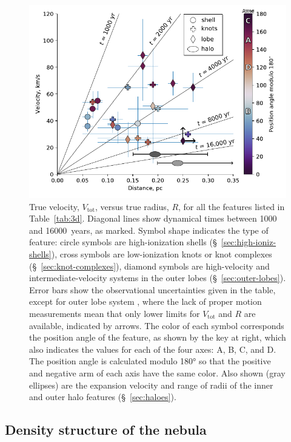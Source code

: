 \documentclass[useAMS, usenatbib]{mnras}
\begin{document}
\begin{figure}
  \includegraphics[width=\linewidth]
  {figs/vel-radius-systems-annotated.pdf}
  \caption{
    True velocity, \(V_{\text{tot}}\), versus true radius, \(R\), for all the features listed in Table~\ref{tab:3d}.
    Diagonal lines show dynamical times between \num{1000} and \SI{16000}{years}, as marked.
    Symbol shape indicates the type of feature:
    circle symbols are high-ionization shells (\S~\ref{sec:high-ioniz-shells}),
    cross symbols are low-ionization knots or knot complexes (\S~\ref{sec:knot-complexes}),
    diamond symbols are high-velocity and intermediate-velocity systems in the outer lobes (\S~\ref{sec:outer-lobes}).
    Error bars show the observational uncertainties given in the table,
    except for outer lobe system , where the lack of proper motion measurements mean that only lower limits for \(V_{\text{tot}}\) and \(R\) are available, indicated by arrows.
    The color of each symbol corresponds the position angle of the feature, as shown by the key at right,
    which also indicates the values for each of the four axes: A, B, C, and D.
    The position angle is calculated modulo \ang{180} so that the positive and negative arm of each axis have the same color.
    Also shown (gray ellipses) are the expansion velocity and range of radii of the inner and outer halo features (\S~\ref{sec:haloes}).
      }
  \label{fig:ages}
\end{figure}



\subsection{Density structure of the nebula}
\label{sec:density-structure}
\end{document}
